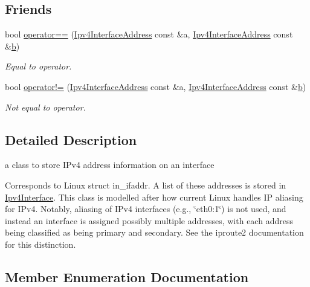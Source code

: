 \subsection*{Friends}
\begin{DoxyCompactItemize}
\item 
bool \hyperlink{classns3_1_1Ipv4InterfaceAddress_ab02529a75690c445b1f47da062d6cdee}{operator==} (\hyperlink{classns3_1_1Ipv4InterfaceAddress}{Ipv4\+Interface\+Address} const \&a, \hyperlink{classns3_1_1Ipv4InterfaceAddress}{Ipv4\+Interface\+Address} const \&\hyperlink{lte__pathloss_8m_a21ad0bd836b90d08f4cf640b4c298e7c}{b})
\begin{DoxyCompactList}\small\item\em Equal to operator. \end{DoxyCompactList}\item 
bool \hyperlink{classns3_1_1Ipv4InterfaceAddress_a93c62bc73f559c489ea78de52c44ce12}{operator!=} (\hyperlink{classns3_1_1Ipv4InterfaceAddress}{Ipv4\+Interface\+Address} const \&a, \hyperlink{classns3_1_1Ipv4InterfaceAddress}{Ipv4\+Interface\+Address} const \&\hyperlink{lte__pathloss_8m_a21ad0bd836b90d08f4cf640b4c298e7c}{b})
\begin{DoxyCompactList}\small\item\em Not equal to operator. \end{DoxyCompactList}\end{DoxyCompactItemize}


\subsection{Detailed Description}
a class to store I\+Pv4 address information on an interface 

Corresponds to Linux struct in\+\_\+ifaddr. A list of these addresses is stored in \hyperlink{classns3_1_1Ipv4Interface}{Ipv4\+Interface}. This class is modelled after how current Linux handles IP aliasing for I\+Pv4. Notably, aliasing of I\+Pv4 interfaces (e.\+g., \char`\"{}eth0\+:1\char`\"{}) is not used, and instead an interface is assigned possibly multiple addresses, with each address being classified as being primary and secondary. See the iproute2 documentation for this distinction. 

\subsection{Member Enumeration Documentation}
